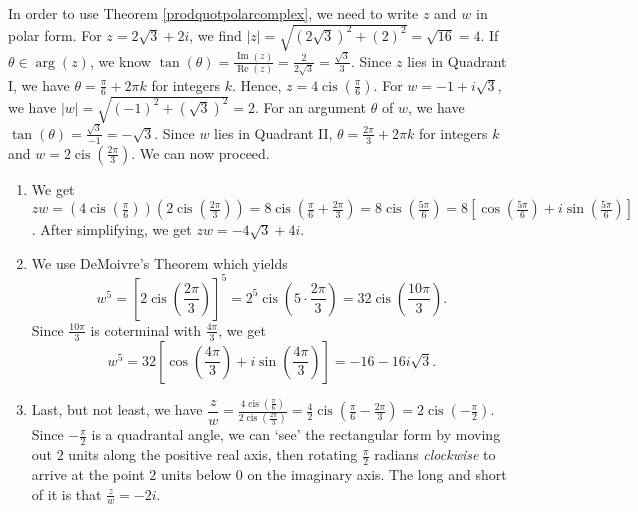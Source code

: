 {In order to use Theorem \ref{prodquotpolarcomplex}, we need to write $z$ and $w$ in polar form.  For $z=2\sqrt{3} + 2i$, we find $|z| = \sqrt{(2\sqrt{3})^2 + (2)^2} = \sqrt{16} = 4$.  If $\theta \in \operatorname{arg}(z)$, we know $\tan(\theta) = \frac{\operatorname{Im}(z)}{\operatorname{Re}(z)} = \frac{2}{2\sqrt{3}} = \frac{\sqrt{3}}{3}$.  Since $z$ lies in Quadrant I, we have $\theta = \frac{\pi}{6} + 2\pi k$ for integers $k$.  Hence, $z = 4 \operatorname{cis}\left(\frac{\pi}{6}\right)$. For $w = -1 + i\sqrt{3}$, we have $|w| = \sqrt{(-1)^2+(\sqrt{3})^2} = 2$.  For an argument $\theta$ of $w$, we have $\tan(\theta) = \frac{\sqrt{3}}{-1} = -\sqrt{3}$.  Since $w$ lies in Quadrant II,  $\theta = \frac{2\pi}{3} + 2\pi k$ for integers $k$ and $w = 2\operatorname{cis}\left(\frac{2\pi}{3}\right)$.  We can now proceed.

\begin{enumerate}

\item  We get $zw = \left(4 \operatorname{cis}\left(\frac{\pi}{6}\right)\right) \left(2\operatorname{cis}\left(\frac{2\pi}{3}\right)\right) = 8\operatorname{cis}\left(\frac{\pi}{6} + \frac{2\pi}{3}\right) = 8\operatorname{cis}\left(\frac{5\pi}{6}\right) = 8\left[ \cos\left(\frac{5\pi}{6}\right) + i\sin\left(\frac{5\pi}{6}\right) \right]$.  After simplifying, we get $zw = -4\sqrt{3} + 4i$.

\item We use DeMoivre's Theorem which yields 
\[
w^{5} = \left[2\operatorname{cis}\left(\frac{2\pi}{3}\right)\right]^{5} = 2^{5} \operatorname{cis} \left(5\cdot \frac{2\pi}{3}\right) = 32 \operatorname{cis}\left(\frac{10\pi}{3}\right).
\]
Since $\frac{10\pi}{3}$ is coterminal with $\frac{4\pi}{3}$, we get
\[
w^{5} = 32\left[ \cos\left(\frac{4\pi}{3}\right) + i\sin\left(\frac{4\pi}{3}\right) \right] = -16-16i\sqrt{3}.
\]

\item  Last, but not least, we have $\dfrac{z}{w} = \frac{4 \operatorname{cis}\left(\frac{\pi}{6}\right)}{2\operatorname{cis}\left(\frac{2\pi}{3}\right)} = \frac{4}{2} \operatorname{cis}\left(\frac{\pi}{6} - \frac{2\pi}{3}\right) = 2\operatorname{cis}\left(-\frac{\pi}{2}\right)$.  Since $-\frac{\pi}{2}$ is a quadrantal angle, we can `see' the rectangular form by moving out $2$ units along the positive real axis, then rotating $\frac{\pi}{2}$ radians \textit{clockwise} to arrive at the point $2$ units below $0$ on the imaginary axis.  The long and short of it is that $\frac{z}{w} = -2i$. 
\end{enumerate}
}

